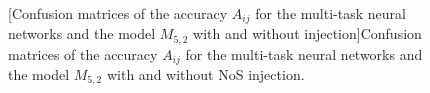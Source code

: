 \begin{figure}[t]
    \centering
    \\
    [Confusion matrices of the accuracy $A_{ij}$ for the multi-task neural networks and the model $M_{5,2}$ with and without injection]{Confusion matrices of the accuracy $A_{ij}$ for the multi-task neural networks and the model $M_{5,2}$  with and without NoS injection.}
    \label{fig:hybrid_multitask_confusionMatrices}
\end{figure}

